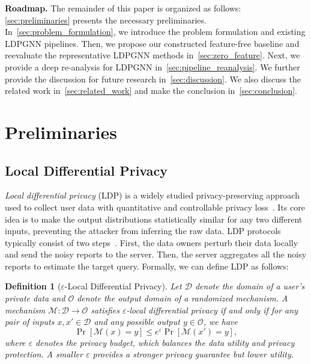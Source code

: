 \documentclass[conference,compsoc]{IEEEtran}
\theoremstyle{boldplain}
\theoremstyle{bolddefinition}
\newtheorem{defi}{Definition}
\theoremstyle{remark}
\newcommand{\mypara}[1]{\noindent\textbf{#1.}\xspace}
\newcommand{\ldpgnn}{LDPGNN\xspace}
\begin{document}
\mypara{Roadmap}
The remainder of this paper is organized as follows: \autoref{sec:preliminaries} presents the necessary preliminaries. 
In~\autoref{sec:problem_formulation},
we introduce the problem formulation and existing \ldpgnn pipelines.
Then, we propose our constructed feature-free baseline and reevaluate the representative \ldpgnn methods in~\autoref{sec:zero_feature}.
Next, we provide a deep re-analysis for \ldpgnn
in~\autoref{sec:pipeline_reanalysis}.
We further provide the discussion for future research in~\autoref{sec:discussion}.
We also discuss the related work in~\autoref{sec:related_work} and make the conclusion in~\autoref{sec:conclusion}.




\section{Preliminaries}
\label{sec:preliminaries}

\subsection{Local Differential Privacy}
\label{subsec:prelim_ldp}


\textit{Local differential privacy} (LDP) is a widely studied privacy-preserving approach used to collect user data with quantitative and controllable privacy loss~\cite{kasiviswanathan2011ldp,dwork2006calibrating}.
Its core idea is to make the output distributions statistically similar for any two different inputs, preventing the attacker from inferring the raw data.
LDP protocols typically consist of two steps~\cite{erlingsson2014rappor,ding2017telemetry,wang2019ldpmultidim}. 
First, the data owners perturb their data locally and send the noisy reports to the server. 
Then, the server aggregates all the noisy reports to estimate the target query.
Formally, we can define LDP as follows: 
\begin{defi}[$\varepsilon$-Local Differential Privacy]
Let $\mathcal D$ denote the domain of a user's private data and $\mathcal O$ denote the output domain of a randomized mechanism. 
A mechanism $\mathcal M:\mathcal D\rightarrow \mathcal O$ satisfies $\varepsilon$-local differential privacy if and only if for any pair of inputs $x,x'\in\mathcal D$ and any possible output $y\in \mathcal O$, we have
\begin{equation}
    \Pr[\mathcal M(x) = y]
    \le
    e^\varepsilon
    \Pr[\mathcal M(x')= y],
    \label{eq:ldp_definition_event}
\end{equation}
where $\varepsilon$ denotes the privacy budget, which balances the data utility and privacy protection.
A smaller $\varepsilon$ provides a stronger privacy guarantee but lower utility.
\end{defi}
\end{document}
